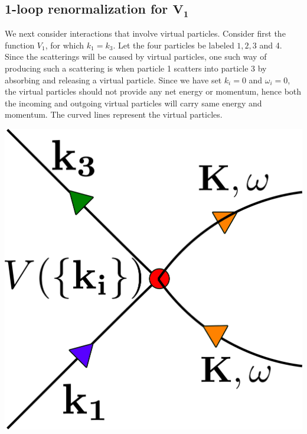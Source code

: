 \documentclass[14pt]{extarticle}
\begin{document}
\subsection{1-loop renormalization for \(\mathbf{V_1}\)}
\begin{minipage}{350pt}

	We next consider interactions that involve virtual particles. Consider first the function \(V_1\), for which \(k_1=k_3\). Let the four particles be labeled \(1,2,3\) and 4. Since the scatterings will be caused by virtual particles, one such way of producing such a scattering is when particle 1 scatters into particle 3 by absorbing and releasing a virtual particle. Since we have set \(k_i = 0\) and \(\omega_i = 0\), the virtual particles should not provide any net energy or momentum, hence both the incoming and outgoing virtual particles will carry same energy and momentum. The curved lines represent the virtual particles.
\end{minipage}
\begin{minipage}{200pt}
	\begin{center} \includegraphics[scale=0.35]{./figures/term1.png}\end{center}
\end{minipage}\\\\
\end{document}
